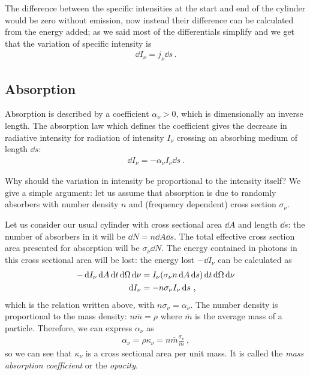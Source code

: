 \documentclass[main.tex]{subfiles}
\begin{document}
The difference between the specific intensities at the start and end of the cylinder would be zero without emission, now instead their difference can be calculated from the energy added; as we said most of the differentials simplify and we get that the variation of specific intensity is
%
\begin{align}
\dd{I_{\nu }} = j_{\nu } \dd{s}
\,.
\end{align}

\subsection{Absorption}

Absorption is described by a coefficient \(\alpha_{\nu }>0\), which is dimensionally an inverse length. 
The absorption law which defines the coefficient gives the decrease in radiative intensity for radiation of intensity \(I_{\nu }\) crossing an absorbing medium of length \(\dd{s}\):
%
\begin{align}
\dd{I_{\nu }} =- \alpha_{\nu } I_{\nu } \dd{s}
\,.
\end{align}

Why should the variation in intensity be proportional to the intensity itself? We give a simple argument: 
let us assume that absorption is due to randomly absorbers with number density \(n\) and (frequency dependent) cross section \(\sigma_{\nu }\).  

Let us consider our usual cylinder with cross sectional area \(\dd{A}\) and length \(\dd{s}\): the number of absorbers in it will be \(\dd{N} = n \dd{A} \dd{s}\). 
The total effective cross section area presented for absorption will be \(\sigma_{\nu } \dd{N}\). 
The energy contained in photons in this cross sectional area will be lost: the energy lost \(- \dd{I_{\nu }}\) can be calculated as 
%
\begin{subequations}
\begin{align}
- \dd{I_{\nu }} \dd{A} \dd{t} \dd{\Omega} \dd{\nu }
&=  I_{\nu } \qty(\sigma_{\nu } n \dd{A} \dd{s}) \dd{t} \dd{\Omega } \dd{\nu }  \\
\dd{I_{\nu }} &= - n \sigma_{\nu } I_{\nu } \dd{s}
\,,
\end{align}
\end{subequations}
%
which is the relation written above, with \(n \sigma_{\nu } = \alpha_{\nu }\). 
The number density is proportional to the mass density: \(n \overline{m} = \rho \) where \(\overline{m} \) is the average mass of a particle. Therefore, we can express \(\alpha_{\nu }\) as 
%
\begin{align}
\alpha_{\nu } = \rho \kappa_{\nu } = n \overline{m} \frac{ \sigma_{\nu }}{\overline{m}}
\,,
\end{align}
%
so we can see that \(\kappa_{\nu }\) is a cross sectional area per unit mass. It is called the \emph{mass absorption coefficient} or the \emph{opacity}. 
\end{document}
